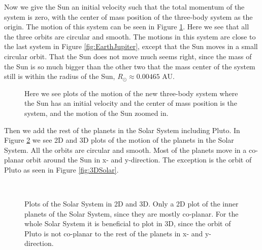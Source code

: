 \documentclass[12pt,a4paper,english]{article}
\begin{document}
Now we give the Sun an initial velocity such that the total momentum of the system is zero, with the center of mass position of the three-body system as the origin. The motion of this system can be seen in Figure  \ref{fig:SunEarthJupiter}. Here we see that all the three orbits are circular and smooth. The motions in this system are close to the last system in Figure \ref{fig:EarthJupiter}, except that the Sun moves in a small circular orbit. That the Sun does not move much seems right, since the mass of the Sun is so much bigger than the other two that the mass center of the system still is within the radius of the Sun, $R_{\odot}\approx 0.00465$ AU.

\begin{figure}[htbp]
	\hspace{0.5em}
	\caption{Here we see plots of the motion of the new three-body system where the Sun has an initial velocity and the center of mass position is the system, and the motion of the Sun zoomed in. \label{fig:SunEarthJupiter}}
\end{figure}

Then we add the rest of the planets in the Solar System including Pluto. In Figure \ref{fig:SolarSystem} we see 2D and 3D plots of the motion of the planets in the Solar System. All the orbits are circular and smooth. Most of the planets move in a co-planar orbit around the Sun in x- and y-direction. The exception is the orbit of Pluto as seen in Figure \ref{fig:3DSolar}.

\begin{figure}[htbp]
	\hspace{0.5em}
	\\
	\caption{Plots of the Solar System in 2D and 3D. Only a 2D plot of the inner planets of the Solar System, since they are mostly co-planar. For the whole Solar System it is beneficial to plot in 3D, since the orbit of Pluto is not co-planar to the rest of the planets in x- and y-direction. \label{fig:SolarSystem}}
\end{figure}
\end{document}
